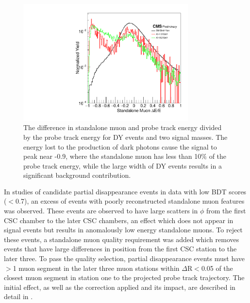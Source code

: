 \begin{figure}[htpb]
	\centering
	\includegraphics[width=0.8\textwidth]{figures/allEventsStandaloneMuondEoverE_stack.pdf}
	\caption[Standalone Muon Energy Differences]{The difference in standalone muon and probe track energy divided by the probe track energy for DY events and two signal masses. The energy lost to the production of dark photons cause the signal to peak near -0.9, where the standalone muon has less than 10$\%$ of the probe track energy, while the large width of DY events results in a significant background contribution.}
	\label{fig:staDEoverE}
\end{figure}

In studies of candidate partial disappearance events in data with low BDT scores ($<$0.7), an excess of events with poorly reconstructed standalone muon features was observed.
These events are observed to have large scatters in $\phi$ from the first CSC chamber to the later CSC chambers, an effect which does not appear in signal events but results in anomalously low energy standalone muons.
To reject these events, a standalone muon quality requirement was added which removes events that have large differences in position from the first CSC station to the later three.
To pass the quality selection, partial disappearance events must have $>$1 muon segment in the later three muon stations within $\Delta$R$<$0.05 of the closest muon segment in station one to the projected probe track trajectory.
The initial effect, as well as the correction applied and its impact, are described in detail in .
